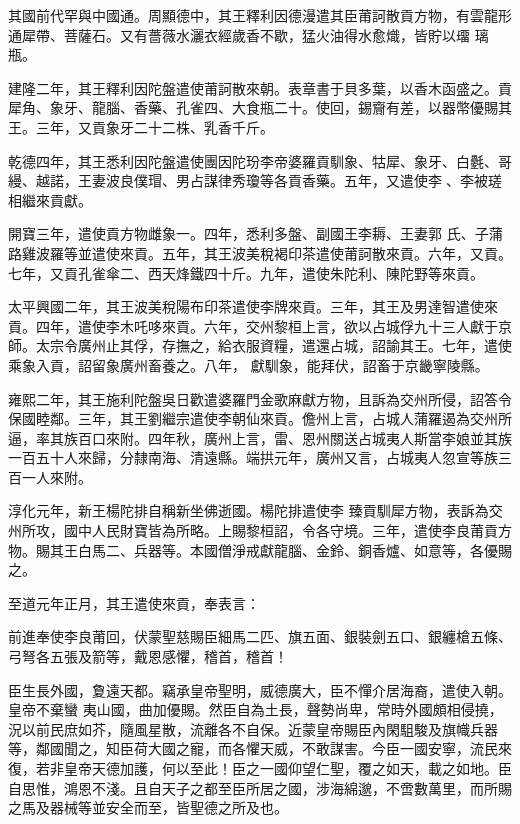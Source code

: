 \begin{pinyinscope}
 其國前代罕與中國通。周顯德中，其王釋利因德漫遣其臣莆訶散貢方物，有雲龍形通犀帶、菩薩石。又有薔薇水灑衣經歲香不歇，猛火油得水愈熾，皆貯以璢
 璃瓶。



 建隆二年，其王釋利因陀盤遣使莆訶散來朝。表章書于貝多葉，以香木函盛之。貢犀角、象牙、龍腦、香藥、孔雀四、大食瓶二十。使回，錫齎有差，以器幣優賜其王。三年，又貢象牙二十二株、乳香千斤。



 乾德四年，其王悉利因陀盤遣使團因陀玢李帝婆羅貢馴象、牯犀、象牙、白氎、哥縵、越諾，王妻波良僕瑁、男占謀律秀瓊等各貢香藥。五年，又遣使李𠰢、李被瑳相繼來貢獻。



 開寶三年，遣使貢方物雌象一。四年，悉利多盤、副國王李耨、王妻郭
 氏、子蒲路雞波羅等並遣使來貢。五年，其王波美稅褐印茶遣使莆訶散來貢。六年，又貢。七年，又貢孔雀傘二、西天烽鐵四十斤。九年，遣使朱陀利、陳陀野等來貢。



 太平興國二年，其王波美稅陽布印茶遣使李牌來貢。三年，其王及男達智遣使來貢。四年，遣使李木吒哆來貢。六年，交州黎桓上言，欲以占城俘九十三人獻于京師。太宗令廣州止其俘，存撫之，給衣服資糧，遣還占城，詔諭其王。七年，遣使乘象入貢，詔留象廣州畜養之。八年，
 獻馴象，能拜伏，詔畜于京畿寧陵縣。



 雍熙二年，其王施利陀盤吳日歡遣婆羅門金歌麻獻方物，且訴為交州所侵，詔答令保國睦鄰。三年，其王劉繼宗遣使李朝仙來貢。儋州上言，占城人蒲羅遏為交州所逼，率其族百口來附。四年秋，廣州上言，雷、恩州關送占城夷人斯當李娘並其族一百五十人來歸，分隸南海、清遠縣。端拱元年，廣州又言，占城夷人忽宣等族三百一人來附。



 淳化元年，新王楊陀排自稱新坐佛逝國。楊陀排遣使李
 臻貢馴犀方物，表訴為交州所攻，國中人民財寶皆為所略。上賜黎桓詔，令各守境。三年，遣使李良莆貢方物。賜其王白馬二、兵器等。本國僧淨戒獻龍腦、金鈴、銅香爐、如意等，各優賜之。



 至道元年正月，其王遣使來貢，奉表言：



 前進奉使李良莆回，伏蒙聖慈賜臣細馬二匹、旗五面、銀裝劍五口、銀纏槍五條、弓弩各五張及箭等，戴恩感懼，稽首，稽首！



 臣生長外國，夐遠天都。竊承皇帝聖明，威德廣大，臣不憚介居海裔，遣使入朝。皇帝不棄蠻
 夷山國，曲加優賜。然臣自為土長，聲勢尚卑，常時外國頗相侵撓，況以前民庶如芥，隨風星散，流離各不自保。近蒙皇帝賜臣內閑駔駿及旗幟兵器等，鄰國聞之，知臣荷大國之寵，而各懼天威，不敢謀害。今臣一國安寧，流民來復，若非皇帝天德加護，何以至此！臣之一國仰望仁聖，覆之如天，載之如地。臣自思惟，鴻恩不淺。且自天子之都至臣所居之國，涉海綿邈，不啻數萬里，而所賜之馬及器械等並安全而至，皆聖德之所及也。




\end{pinyinscope}
